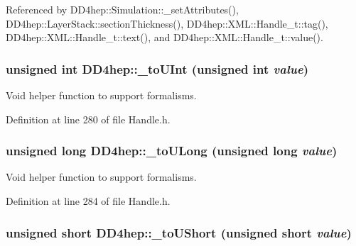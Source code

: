 Referenced by DD4hep::Simulation::\_\-setAttributes(), DD4hep::LayerStack::sectionThickness(), DD4hep::XML::Handle\_\-t::tag(), DD4hep::XML::Handle\_\-t::text(), and DD4hep::XML::Handle\_\-t::value().\hypertarget{group___d_d4_h_e_p___g_e_o_m_e_t_r_y_gab71d50eed88236ff6d21b5a29c7bba70}{
\subsubsection[{\_\-toUInt}]{\setlength{\rightskip}{0pt plus 5cm}unsigned int DD4hep::\_\-toUInt (unsigned int {\em value})}}
\label{group___d_d4_h_e_p___g_e_o_m_e_t_r_y_gab71d50eed88236ff6d21b5a29c7bba70}


Void helper function to support formalisms. 

Definition at line 280 of file Handle.h.\hypertarget{group___d_d4_h_e_p___g_e_o_m_e_t_r_y_gac59edb5f6a7d0fe5aa11255ef5b48bae}{
\subsubsection[{\_\-toULong}]{\setlength{\rightskip}{0pt plus 5cm}unsigned long DD4hep::\_\-toULong (unsigned long {\em value})}}
\label{group___d_d4_h_e_p___g_e_o_m_e_t_r_y_gac59edb5f6a7d0fe5aa11255ef5b48bae}


Void helper function to support formalisms. 

Definition at line 284 of file Handle.h.\hypertarget{group___d_d4_h_e_p___g_e_o_m_e_t_r_y_gaff8a702098e20c2aa071703222b5a73e}{
\subsubsection[{\_\-toUShort}]{\setlength{\rightskip}{0pt plus 5cm}unsigned short DD4hep::\_\-toUShort (unsigned short {\em value})}}
\label{group___d_d4_h_e_p___g_e_o_m_e_t_r_y_gaff8a702098e20c2aa071703222b5a73e}


